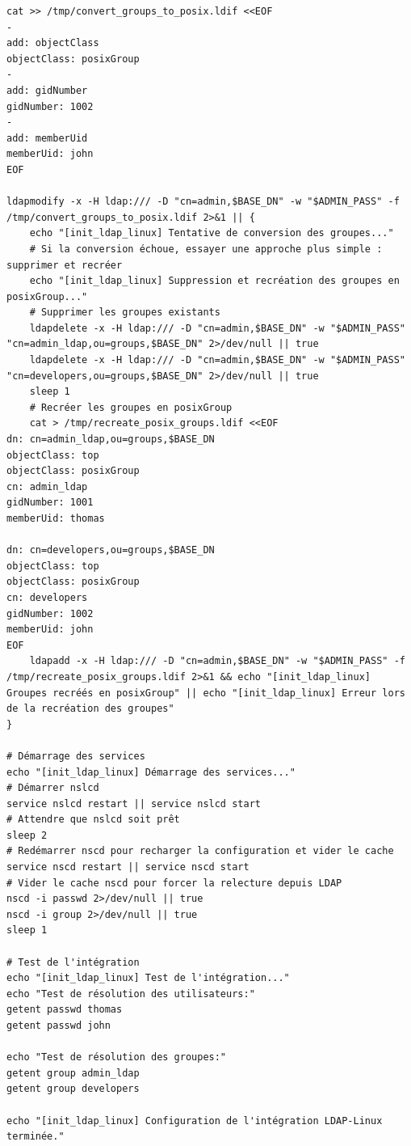 {\begin{verbatim}
cat >> /tmp/convert_groups_to_posix.ldif <<EOF
-
add: objectClass
objectClass: posixGroup
-
add: gidNumber
gidNumber: 1002
-
add: memberUid
memberUid: john
EOF

ldapmodify -x -H ldap:/// -D "cn=admin,$BASE_DN" -w "$ADMIN_PASS" -f /tmp/convert_groups_to_posix.ldif 2>&1 || {
    echo "[init_ldap_linux] Tentative de conversion des groupes..."
    # Si la conversion échoue, essayer une approche plus simple : supprimer et recréer
    echo "[init_ldap_linux] Suppression et recréation des groupes en posixGroup..."
    # Supprimer les groupes existants
    ldapdelete -x -H ldap:/// -D "cn=admin,$BASE_DN" -w "$ADMIN_PASS" "cn=admin_ldap,ou=groups,$BASE_DN" 2>/dev/null || true
    ldapdelete -x -H ldap:/// -D "cn=admin,$BASE_DN" -w "$ADMIN_PASS" "cn=developers,ou=groups,$BASE_DN" 2>/dev/null || true
    sleep 1
    # Recréer les groupes en posixGroup
    cat > /tmp/recreate_posix_groups.ldif <<EOF
dn: cn=admin_ldap,ou=groups,$BASE_DN
objectClass: top
objectClass: posixGroup
cn: admin_ldap
gidNumber: 1001
memberUid: thomas

dn: cn=developers,ou=groups,$BASE_DN
objectClass: top
objectClass: posixGroup
cn: developers
gidNumber: 1002
memberUid: john
EOF
    ldapadd -x -H ldap:/// -D "cn=admin,$BASE_DN" -w "$ADMIN_PASS" -f /tmp/recreate_posix_groups.ldif 2>&1 && echo "[init_ldap_linux] Groupes recréés en posixGroup" || echo "[init_ldap_linux] Erreur lors de la recréation des groupes"
}

# Démarrage des services
echo "[init_ldap_linux] Démarrage des services..."
# Démarrer nslcd
service nslcd restart || service nslcd start
# Attendre que nslcd soit prêt
sleep 2
# Redémarrer nscd pour recharger la configuration et vider le cache
service nscd restart || service nscd start
# Vider le cache nscd pour forcer la relecture depuis LDAP
nscd -i passwd 2>/dev/null || true
nscd -i group 2>/dev/null || true
sleep 1

# Test de l'intégration
echo "[init_ldap_linux] Test de l'intégration..."
echo "Test de résolution des utilisateurs:"
getent passwd thomas
getent passwd john

echo "Test de résolution des groupes:"
getent group admin_ldap
getent group developers

echo "[init_ldap_linux] Configuration de l'intégration LDAP-Linux terminée."
\end{verbatim}
}

